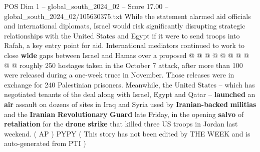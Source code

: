 \begin{textsample}{POS Dim 1 – global\_south\_2024\_02 – Score 17.00 – global\_south\_2024\_02/105630375.txt}
While the statement alarmed aid officials and international diplomats, Israel would risk significantly disrupting strategic relationships with the United States and Egypt if it were to send troops into Rafah, a key entry point for aid.
International mediators continued to work to close \textbf{wide} gaps between Israel and Hamas over a proposed @ @ @ @ @ @ @ @ @ @ roughly 250 hostages taken in the October 7 attack, after more than 100 were released during a one-week truce in November.
Those releases were in exchange for 240 Palestinian prisoners.
Meanwhile, the United States -- which has negotiated tenants of the deal along with Israel, Egypt and Qatar -- \textbf{launched} an \textbf{air} assault on dozens of sites in Iraq and Syria used by \textbf{Iranian-backed} \textbf{militias} and the \textbf{Iranian} \textbf{Revolutionary} \textbf{Guard} late Friday, in the opening \textbf{salvo} of \textbf{retaliation} for the \textbf{drone} \textbf{strike} that killed three US troops in Jordan last weekend. ( AP ) PYPY ( This story has not been edited by THE WEEK and is auto-generated from PTI )

\end{textsample}
